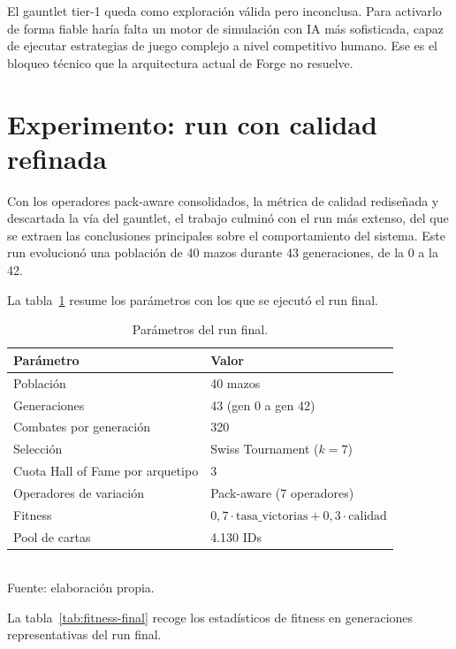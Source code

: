 El gauntlet tier-1 queda como exploración válida pero inconclusa. Para activarlo de forma fiable haría falta un motor de simulación con IA más sofisticada, capaz de ejecutar estrategias de juego complejo a nivel competitivo humano. Ese es el bloqueo técnico que la arquitectura actual de Forge no resuelve.

\section{Experimento: run con calidad refinada}
\label{sec:run-final}

Con los operadores pack-aware consolidados, la métrica de calidad rediseñada y descartada la vía del gauntlet, el trabajo culminó con el run más extenso, del que se extraen las conclusiones principales sobre el comportamiento del sistema. Este run evolucionó una población de 40 mazos durante 43 generaciones, de la 0 a la 42.

La tabla~\ref{tab:config-final} resume los parámetros con los que se ejecutó el run final.

\begin{table}[H]
\centering
\caption{Parámetros del run final.}
\label{tab:config-final}
\begin{tabular}{ll}
\toprule
\textbf{Parámetro} & \textbf{Valor} \\
\midrule
Población & 40 mazos \\
Generaciones & 43 (gen 0 a gen 42) \\
Combates por generación & 320 \\
Selección & Swiss Tournament ($k=7$) \\
Cuota Hall of Fame por arquetipo & 3 \\
Operadores de variación & Pack-aware (7 operadores) \\
Fitness & $0{,}7 \cdot \text{tasa\_victorias} + 0{,}3 \cdot \text{calidad}$ \\
Pool de cartas & 4.130 IDs \\
\bottomrule
\end{tabular}
\\[2pt]{\footnotesize Fuente: elaboración propia.}
\end{table}

La tabla~\ref{tab:fitness-final} recoge los estadísticos de fitness en generaciones representativas del run final.

